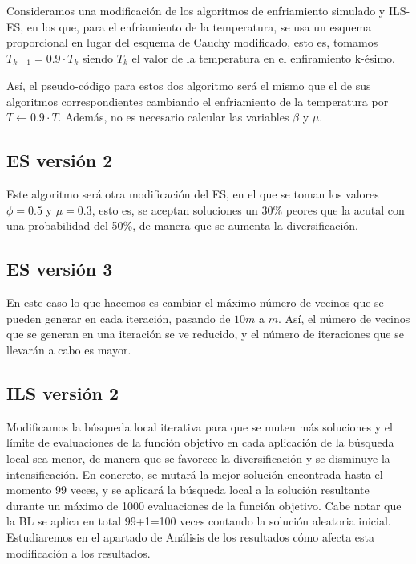 \documentclass[11pt,a4paper]{article}
\begin{document}
Consideramos una modificación de los algoritmos de enfriamiento simulado y ILS-ES, en los que, para el enfriamiento de la temperatura, se usa un esquema proporcional en lugar del esquema de Cauchy modificado, esto es, tomamos $T_{k+1}=0.9\cdot T_k$ siendo $T_k$ el valor de la temperatura en el enfiramiento k-ésimo. 

Así, el pseudo-código para estos dos algoritmo será el mismo que el de sus algoritmos correspondientes cambiando el enfriamiento de la temperatura por $ T \leftarrow 0.9\cdot T $. Además, no es necesario calcular las variables $\beta$ y $\mu$. 

\subsection{ES versión 2}

Este algoritmo será otra modificación del ES, en el que se toman los valores  $\phi=0.5$ y $\mu=0.3$, esto es, se aceptan soluciones un 30\% peores que la acutal con una probabilidad del 50\%, de manera que se aumenta la diversificación. 

\subsection{ES versión 3}

En este caso lo que hacemos es cambiar el máximo número de vecinos que se pueden generar en cada iteración, pasando de $ 10 m $ a $ m $. Así, el número de vecinos que se generan en una iteración se ve reducido, y el número de iteraciones que se llevarán a cabo es mayor. 

\subsection{ILS versión 2}

Modificamos la búsqueda local iterativa para que se muten más soluciones y el límite de evaluaciones de la función objetivo en cada aplicación de la búsqueda local sea menor, de manera que se favorece la diversificación y se disminuye la intensificación. En concreto, se mutará la mejor solución encontrada hasta el momento 99 veces, y se aplicará la búsqueda local a la solución resultante durante un máximo de 1000 evaluaciones de la función objetivo. Cabe notar que la BL se aplica en total 99+1=100 veces contando la solución aleatoria inicial.  Estudiaremos en el apartado de Análisis de los resultados cómo afecta esta modificación a los resultados. 
\end{document}
